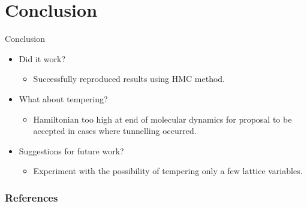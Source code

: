 \documentclass{beamer}
\begin{document}
\section{Conclusion}
    \begin{frame}{Conclusion}
        \begin{itemize}
            \item<1-> Did it work? 
            \begin{itemize}
                \item<1-> Successfully reproduced results using HMC method.
            \end{itemize}
            \item<2-> What about tempering?
            \begin{itemize}
                \item<2-> Hamiltonian too high at end of molecular dynamics for proposal to be accepted in cases where tunnelling occurred.
            \end{itemize}
            \item<3-> Suggestions for future work?
            \begin{itemize}
                \item<3-> Experiment with the possibility of tempering only a few lattice variables.
            \end{itemize}
        \end{itemize}
    \end{frame}


\begin{frame}[t, allowframebreaks]
    \frametitle{References}
    
    
\end{frame}
\end{document}
